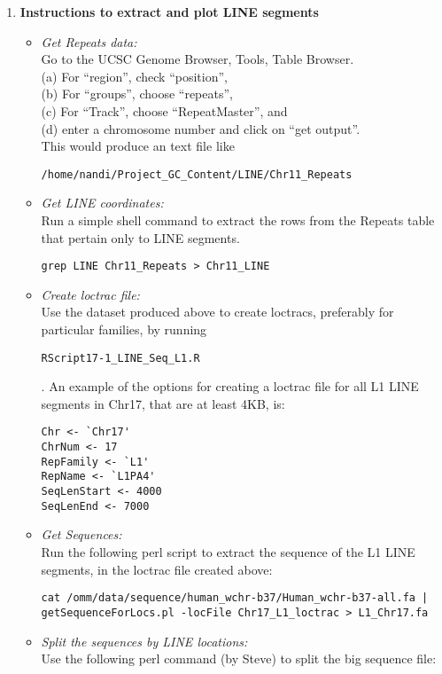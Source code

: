 \documentclass[11pt]{article}
\begin{document}
\begin{enumerate}
\item
{\bf{Instructions to extract and plot LINE segments}}
\begin{itemize}
\item 
\emph{Get Repeats data:} \\ 
Go to the UCSC Genome Browser, Tools, Table Browser. \\
(a) For ``region'', check ``position'', \\
(b) For ``groups'', choose ``repeats'', \\
(c) For ``Track'', choose ``RepeatMaster'', and \\
(d) enter a chromosome number and click on ``get output''. \\ 
This would produce an text file like 
\begin{verbatim}
/home/nandi/Project_GC_Content/LINE/Chr11_Repeats
\end{verbatim}
\item
\emph{Get LINE coordinates:} \\ 
Run a simple shell command to extract the rows from the Repeats table that pertain only to LINE segments.
\begin{verbatim}
grep LINE Chr11_Repeats > Chr11_LINE
\end{verbatim}
\item
\emph{Create loctrac file:} \\ 
Use the dataset produced above to create loctracs, preferably for particular families, by running 
\begin{verbatim} 
RScript17-1_LINE_Seq_L1.R 
\end{verbatim}. 
An example of the options for creating a loctrac file for all L1 LINE segments in Chr17, that are at least 4KB, is:
\begin{verbatim}
Chr <- `Chr17'
ChrNum <- 17
RepFamily <- `L1'
RepName <- `L1PA4'
SeqLenStart <- 4000
SeqLenEnd <- 7000
\end{verbatim}
\item
\emph{Get Sequences:} \\ 
Run the following perl script to extract the sequence of the L1 LINE segments, in the loctrac file created above:
\begin{verbatim}
cat /omm/data/sequence/human_wchr-b37/Human_wchr-b37-all.fa | 
getSequenceForLocs.pl -locFile Chr17_L1_loctrac > L1_Chr17.fa
\end{verbatim}
\item
\emph{Split the sequences by LINE locations:} \\
Use the following perl command (by Steve) to split the big sequence file: 

\end{itemize}
\end{enumerate}
\end{document}
